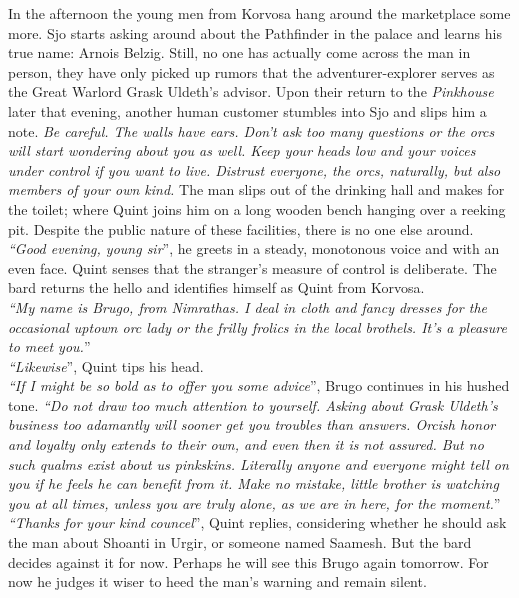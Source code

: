 In the afternoon the young men from Korvosa hang around the marketplace some more. Sjo starts asking around about the Pathfinder in the palace and learns his true name: Arnois Belzig. Still, no one has actually come across the man in person, they have only picked up rumors that the adventurer-explorer serves as the Great Warlord Grask Uldeth's advisor. Upon their return to the {\itshape Pinkhouse} later that evening, another human customer stumbles into Sjo and slips him a note.  {\itshape Be careful. The walls have ears. Don't ask too many questions or the orcs will start wondering about you as well. Keep your heads low and your voices under control if you want to live. Distrust everyone, the orcs, naturally, but also members of your own kind.}  The man slips out of the drinking hall and makes for the toilet; where Quint joins him on a long wooden bench hanging over a reeking pit. Despite the public nature of these facilities, there is no one else around.\\

{\itshape``Good evening, young sir}'', he greets in a steady, monotonous voice and with an even face. Quint senses that the stranger's measure of control is deliberate. The bard returns the hello and identifies himself as Quint from Korvosa.\\

{\itshape``My name is Brugo, from Nimrathas. I deal in cloth and fancy dresses for the occasional uptown orc lady or the frilly frolics in the local brothels. It's a pleasure to meet you.}''\\

{\itshape``Likewise}'', Quint tips his head.\\

{\itshape``If I might be so bold as to offer you some advice}'', Brugo continues in his hushed tone. {\itshape``Do not draw too much attention to yourself. Asking about Grask Uldeth's business too adamantly will sooner get you troubles than answers. Orcish honor and loyalty only extends to their own, and even then it is not assured. But no such qualms exist about us pinkskins. Literally anyone and everyone might tell on you if he feels he can benefit from it. Make no mistake, little brother is watching you at all times, unless you are truly alone, as we are in here, for the moment.}''\\

{\itshape``Thanks for your kind councel}'', Quint replies, considering whether he should ask the man about Shoanti in Urgir, or someone named Saamesh. But the bard decides against it for now. Perhaps he will see this Brugo again tomorrow. For now he judges it wiser to heed the man's warning and remain silent.\\


